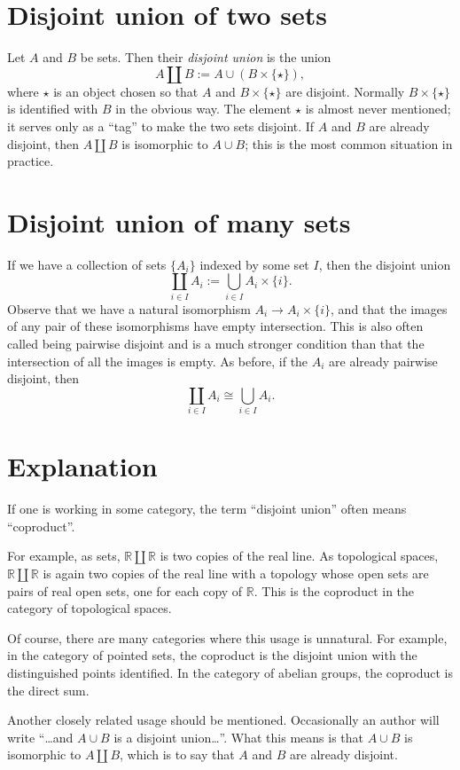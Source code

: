 \documentclass[12pt]{article}
\begin{document}
\section*{Disjoint union of two sets}

Let $A$ and $B$ be sets.  Then their \emph{disjoint union} is the union
\[
A\coprod B := A\cup(B\times\{\star\}),
\]
where $\star$ is an object chosen so that
$A$ and $B\times\{\star\}$ are disjoint.
Normally $B\times\{\star\}$ is identified with $B$ in the obvious way.
The element $\star$ is almost never mentioned;
it serves only as a ``tag'' to make the two sets disjoint.
If $A$ and $B$ are already disjoint,
then $A\coprod B$ is isomorphic to $A\cup B$;
this is the most common situation in practice.

\section*{Disjoint union of many sets}
If we have a collection of sets $\{A_i\}$ indexed by some set $I$,
then the disjoint union
\[
\coprod_{i\in I} A_i := \bigcup_{i\in I} A_i\times\{i\}.
\]
Observe that we have a natural isomorphism $A_i \to A_i\times\{i\}$,
and that the images of any pair of these isomorphisms have empty intersection.
This is also often called being pairwise disjoint
and is a much stronger condition than that
the intersection of all the images is empty.
As before, if the $A_i$ are already pairwise disjoint, then 
\[
\coprod_{i\in I} A_i \cong \bigcup_{i\in I} A_i.
\]

\section*{Explanation}
If one is working in some category,
the term ``disjoint union'' often means ``coproduct''.

For example, as sets, $\mathbb{R}\coprod\mathbb{R}$
is two copies of the real line.
As topological spaces, $\mathbb{R}\coprod\mathbb{R}$
is again two copies of the real line
with a topology whose open sets are pairs of real open sets,
one for each copy of $\mathbb{R}$.
This is the coproduct in the category of topological spaces.

Of course, there are many categories where this usage is unnatural.
For example, in the category of pointed sets,
the coproduct is the disjoint union
with the distinguished points identified.
In the category of abelian groups, the coproduct is the direct sum.

Another closely related usage should be mentioned.
Occasionally an author will write
``\ldots and $A\cup B$ is a disjoint union\ldots''.
What this means is that $A\cup B$ is isomorphic to $A\coprod B$,
which is to say that $A$ and $B$ are already disjoint.
\end{document}
